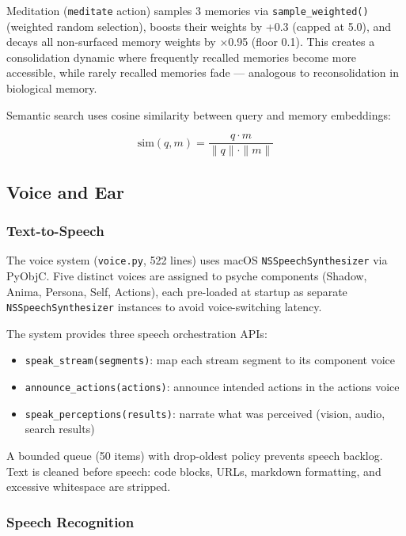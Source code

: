 \documentclass[11pt,oneside]{article}
\begin{document}
Meditation (\texttt{meditate} action) samples 3 memories via \texttt{sample\_weighted()} (weighted random selection), boosts their weights by +0.3 (capped at 5.0), and decays all non-surfaced memory weights by $\times$0.95 (floor 0.1).
This creates a consolidation dynamic where frequently recalled memories become more accessible, while rarely recalled memories fade --- analogous to reconsolidation in biological memory.

Semantic search uses cosine similarity between query and memory embeddings:

\[
\text{sim}(q, m) = \frac{q \cdot m}{\|q\| \cdot \|m\|}
\]

\subsection{Voice and Ear}

\subsubsection{Text-to-Speech}

The voice system (\texttt{voice.py}, 522 lines) uses macOS \texttt{NSSpeechSynthesizer} via PyObjC.
Five distinct voices are assigned to psyche components (Shadow, Anima, Persona, Self, Actions), each pre-loaded at startup as separate \texttt{NSSpeechSynthesizer} instances to avoid voice-switching latency.

The system provides three speech orchestration APIs:

\begin{itemize}
  \item \texttt{speak\_stream(segments)}: map each stream segment to its component voice
  \item \texttt{announce\_actions(actions)}: announce intended actions in the actions voice
  \item \texttt{speak\_perceptions(results)}: narrate what was perceived (vision, audio, search results)
\end{itemize}

A bounded queue (50 items) with drop-oldest policy prevents speech backlog.
Text is cleaned before speech: code blocks, URLs, markdown formatting, and excessive whitespace are stripped.

\subsubsection{Speech Recognition}
\end{document}
